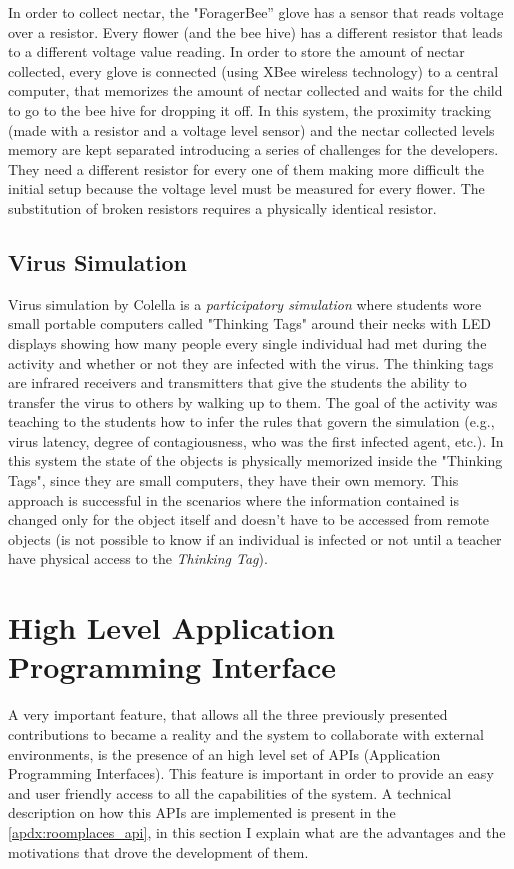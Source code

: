 In order to collect nectar, the "ForagerBee” glove has a sensor that reads voltage over a resistor. Every flower (and the bee hive) has a different resistor that leads to a different voltage value reading. In order to store the amount of nectar collected, every glove is connected (using XBee wireless technology) to a central computer, that memorizes the amount of nectar collected and waits for the child to go to the bee hive for dropping it off. In this system, the proximity tracking  (made with a resistor and a voltage level sensor) and the nectar collected levels memory are kept separated introducing a series of challenges for the developers. They need a different resistor for every one of them making more difficult the initial setup because the voltage level must be measured for every flower. The substitution of broken resistors requires a physically identical resistor. 

\subsection{Virus Simulation}
Virus simulation by Colella \cite{colella:virus} is a \textit{participatory simulation} where students wore small portable computers called "Thinking Tags" around their necks with LED displays showing how many people every single individual had met during the activity and whether or not they are infected with the virus. The thinking tags are infrared receivers and transmitters that give the students the ability to transfer the virus to others by walking up to them. The goal of the activity was teaching to the students how to infer the rules that govern the simulation (e.g., virus latency, degree of contagiousness, who was the first infected agent, etc.). In this system the state of the objects is physically memorized inside the "Thinking Tags", since they are small computers, they have their own memory. This approach is successful in the scenarios where the information contained is changed only for the object itself and doesn't have to be accessed from remote objects (is not possible to know if an individual is infected or not until a teacher have physical access to the \textit{Thinking Tag}).

\section{High Level Application Programming Interface}
A very important feature, that allows all the three previously presented contributions to became a reality and the system to collaborate with external environments, is the presence of an high level set of APIs (Application Programming Interfaces). This feature is important in order to provide an easy and user friendly access to all the capabilities of the system. A technical description on how this APIs are implemented is present in the  \autoref{apdx:roomplaces_api}, in this section I explain what are the advantages and the motivations that drove the development of them.

